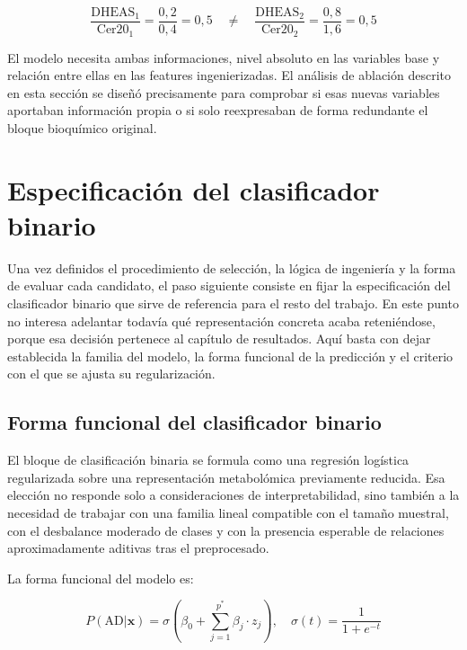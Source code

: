 \begin{equation}
\frac{\text{DHEAS}_1}{\text{Cer20}_1} = \frac{0{,}2}{0{,}4} = 0{,}5 \quad \neq \quad \frac{\text{DHEAS}_2}{\text{Cer20}_2} = \frac{0{,}8}{1{,}6} = 0{,}5
\end{equation}

El modelo necesita ambas informaciones, nivel absoluto en las variables base y relación entre ellas en las features
ingenierizadas. El análisis de ablación descrito en esta sección se diseñó precisamente para comprobar si esas nuevas
variables aportaban información propia o si solo reexpresaban de forma redundante el bloque bioquímico original.

\section{Especificación del clasificador binario}\label{sec:modelo_final}

Una vez definidos el procedimiento de selección, la lógica de ingeniería y la forma de evaluar cada candidato, el paso
siguiente consiste en fijar la especificación del clasificador binario que sirve de referencia para el resto del
trabajo. En este punto no interesa adelantar todavía qué representación concreta acaba reteniéndose, porque esa decisión
pertenece al capítulo de resultados. Aquí basta con dejar establecida la familia del modelo, la forma funcional de la
predicción y el criterio con el que se ajusta su regularización.

\subsection{Forma funcional del clasificador binario}

El bloque de clasificación binaria se formula como una regresión logística regularizada \parencite{cox1958regression,hosmer2000applied} sobre una representación
metabolómica previamente reducida. Esa elección no responde solo a consideraciones de interpretabilidad, sino también a
la necesidad de trabajar con una familia lineal compatible con el tamaño muestral, con el desbalance moderado de clases
y con la presencia esperable de relaciones aproximadamente aditivas tras el preprocesado.

La forma funcional del modelo es:

\begin{equation}\label{eq:modelo}
P(\text{AD} | \mathbf{x}) = \sigma\left(\beta_0 + \sum_{j=1}^{p^\ast} \beta_j \cdot z_j\right), \quad \sigma(t) = \frac{1}{1 + e^{-t}}
\end{equation}


